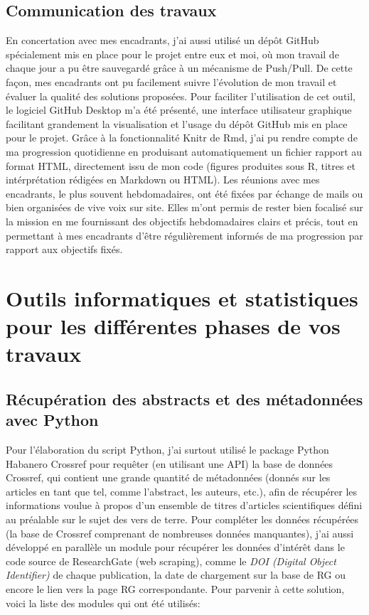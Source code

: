 \documentclass{book}
\begin{document}
\subsection{Communication des travaux}
\noindent
En concertation avec mes encadrants, j'ai aussi utilisé un dépôt GitHub spécialement
mis en place pour le projet entre eux et moi, où mon travail de chaque jour a pu être sauvegardé grâce à un mécanisme de Push/Pull. De cette façon, mes encadrants ont pu facilement suivre l'évolution de mon travail et évaluer la qualité des solutions proposées. Pour faciliter l'utilisation de cet outil, le logiciel GitHub Desktop m'a été présenté, une interface utilisateur graphique facilitant grandement la visualisation et l'usage du dépôt GitHub mis en place pour le projet. Grâce à la fonctionnalité Knitr de Rmd, j'ai pu rendre compte de ma progression quotidienne en produisant automatiquement un fichier rapport au format HTML, directement issu de mon code (figures produites sous R, titres et intérprétation rédigées en Markdown ou HTML). Les réunions avec mes encadrants, le plus souvent hebdomadaires, ont été fixées par échange de mails ou bien organisées de vive voix sur site. Elles m'ont permis de rester bien focalisé sur la mission en me fournissant des objectifs hebdomadaires clairs et précis, tout en permettant à mes encadrants d'être régulièrement informés de ma progression par rapport aux objectifs fixés.

\thispagestyle{fancy}

\section[Outils informatiques et statistiques]{Outils informatiques et
  statistiques pour les différentes phases de vos travaux}
  
\subsection{Récupération des abstracts et des métadonnées avec Python}
\noindent
Pour l'élaboration du script Python, j'ai surtout utilisé le package Python Habanero Crossref pour requêter (en utilisant une API) la base de données Crossref, qui contient une grande
quantité de métadonnées (donnés sur les articles en tant que tel, comme
l'abstract, les auteurs, etc.), afin de récupérer les informations voulue à
propos d'un ensemble de titres d'articles scientifiques défini au préalable sur
le sujet des vers de terre. Pour compléter les données récupérées (la base de
Crossref comprenant de nombreuses données manquantes), j'ai aussi développé en
parallèle un module pour récupérer les données d'intérêt dans le code source de
ResearchGate (web scraping), comme le \textit{DOI (Digital Object Identifier)}
de chaque publication, la date de chargement sur la base de RG ou encore le
lien vers la page RG correspondante. Pour parvenir à cette solution, voici la liste des modules qui ont été utilisés:
\end{document}
